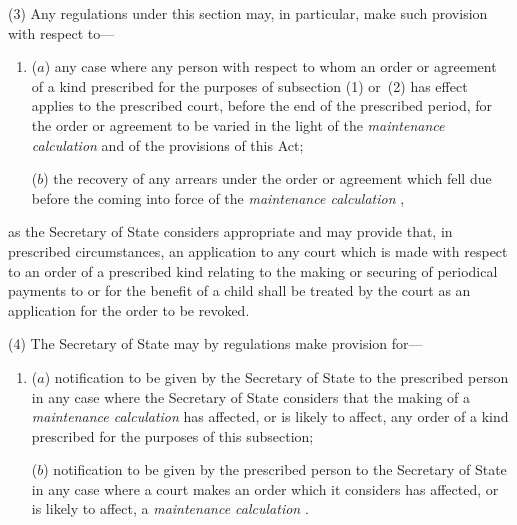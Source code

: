 \documentclass[12pt,a4paper]{article}
\begin{document}
(3) Any regulations under this section may, in particular, make such provision with respect to—
\begin{enumerate}\item[]
($a$) any case where any person with respect to whom an order or agreement of a kind prescribed for the purposes of subsection (1)  or~(2)  has effect applies to the prescribed court, before the end of the prescribed period, for the order or agreement to be varied in the light of the 
\emph{maintenance calculation}  %
and of the provisions of this Act;

($b$) the recovery of any arrears under the order or agreement which fell due before the coming into force of the 
\emph{maintenance calculation}%
,
\end{enumerate}
as the Secretary of State considers appropriate and may provide that, in prescribed circumstances, an application to any court which is made with respect to an order of a prescribed kind relating to the making or securing of periodical payments to or for the benefit of a child shall be treated by the court as an application for the order to be revoked.

(4) The Secretary of State may by regulations make provision for—
\begin{enumerate}\item[]
($a$) notification to be given by 
the 
Secretary of State  %
to the prescribed person in any case where 
the Secretary of State  %
considers that the making of a 
\emph{maintenance calculation}  %
has affected, or is likely to affect, any order of a kind prescribed for the purposes of this subsection;

($b$) notification to be given by the prescribed person to the 
Secretary of State  %
in any case where a court makes an order which it considers has affected, or is likely to affect, a 
\emph{maintenance calculation}%
.
\end{enumerate}
\end{document}

